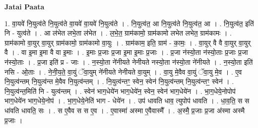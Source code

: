 \documentclass[17pt]{extarticle}
\begin{document}
\textbf{Jatai Paata} \newline

1. वा॒यवे॑ नि॒युत्व॑ते नि॒युत्व॑ते वा॒यवे॑ वा॒यवे॑ नि॒युत्व॑ते । . नि॒युत्व॑त॒ आ नि॒युत्व॑ते नि॒युत्व॑त॒ आ । . नि॒युत्व॑त॒ इति॑ नि - युत्व॑ते । . आ ल॑भेत लभे॒ता ल॑भेत । . ल॒भे॒त॒ ग्राम॑कामो॒ ग्राम॑कामो लभेत लभेत॒ ग्राम॑कामः । . ग्राम॑कामो वा॒युर् वा॒युर् ग्राम॑कामो॒ ग्राम॑कामो वा॒युः । . ग्राम॑काम॒ इति॒ ग्राम॑ - का॒मः॒ । . वा॒युर् वै वै वा॒युर् वा॒युर् वै । . वा इ॒मा इ॒मा वै वा इ॒माः । . इ॒माः प्र॒जाः प्र॒जा इ॒मा इ॒माः प्र॒जाः । . प्र॒जा न॑स्यो॒ता न॑स्यो॒ताः प्र॒जाः प्र॒जा न॑स्यो॒ताः । . प्र॒जा इति॑ प्र - जाः । . न॒स्यो॒ता ने॑नीयते नेनीयते नस्यो॒ता न॑स्यो॒ता ने॑नीयते । . न॒स्यो॒ता इति॑ नसि - ओ॒ताः । . ने॒नी॒य॒ते॒ वा॒युं ॅवा॒युम् ने॑नीयते नेनीयते वा॒युम् । . वा॒यु मे॒वैव वा॒युं ॅवा॒यु मे॒व । . ए॒व नि॒युत्व॑न्तम् नि॒युत्व॑न्त मे॒वैव नि॒युत्व॑न्तम् । . नि॒युत्व॑न्तꣳ॒॒ स्वेन॒ स्वेन॑ नि॒युत्व॑न्तम् नि॒युत्व॑न्तꣳ॒॒ स्वेन॑ । . नि॒युत्व॑न्त॒मिति॑ नि - युत्व॑न्तम् । . स्वेन॑ भाग॒धेये॑न भाग॒धेये॑न॒ स्वेन॒ स्वेन॑ भाग॒धेये॑न । . भा॒ग॒धेये॒नोपोप॑ भाग॒धेये॑न भाग॒धेये॒नोप॑ । . भा॒ग॒धेये॒नेति॑ भाग - धेये॑न । . उप॑ धावति धाव॒ त्युपोप॑ धावति । . धा॒व॒ति॒ स स धा॑वति धावति॒ सः । . स ए॒वैव स स ए॒व । . ए॒वास्मा॑ अस्मा ए॒वैवास्मै᳚ । . अ॒स्मै॒ प्र॒जाः प्र॒जा अ॑स्मा अस्मै प्र॒जाः । \newline
\end{document}

